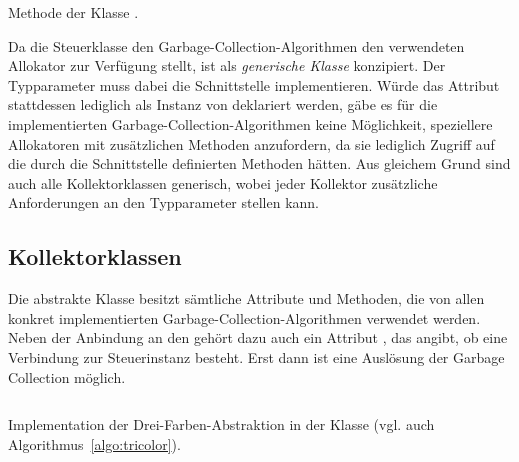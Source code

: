 \begin{listing}[h]
	\inputminted[]{java}{code/Controller-collect.java}
	\caption[Methode  der Klasse ]{Methode  der Klasse .}
	\label{java:controller-collect}
\end{listing}

Da die Steuerklasse den Garbage-Collection-Algorithmen den verwendeten Allokator zur Verfügung stellt, ist  als \textit{generische Klasse} konzipiert.
Der Typparameter  muss dabei die Schnittstelle  implementieren.
Würde das Attribut  stattdessen lediglich als Instanz von  deklariert werden, gäbe es für die implementierten Garbage-Collection-Algorithmen keine Möglichkeit, speziellere Allokatoren mit zusätzlichen Methoden anzufordern, da sie lediglich Zugriff auf die durch die Schnittstelle definierten Methoden hätten.
Aus gleichem Grund sind auch alle Kollektorklassen generisch, wobei jeder Kollektor zusätzliche Anforderungen an den Typparameter stellen kann.

\subsection{Kollektorklassen}
\label{sub:impl-gc}
Die abstrakte Klasse  besitzt sämtliche Attribute und Methoden, die von allen konkret implementierten Garbage-Collection-Algorithmen verwendet werden.
Neben der Anbindung an den  gehört dazu auch ein Attribut , das angibt, ob eine Verbindung zur Steuerinstanz besteht.
Erst dann ist eine Auslösung der Garbage Collection möglich.

\begin{listing}[t!]
	\inputminted[]{java}{code/MarkSweep-core.java}
	\caption[Implementation der Drei-Farben-Abstraktion]{Implementation der Drei-Farben-Abstraktion in der Klasse  (vgl. auch Algorithmus~\ref{algo:tricolor}).}
	\label{java:tricolor-core}
\end{listing}

